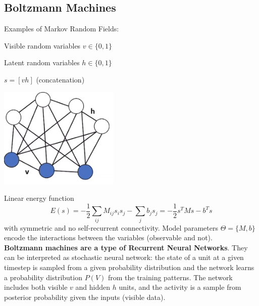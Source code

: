 \documentclass[10pt]{report}
\begin{document}
\subsection{Boltzmann Machines}
Examples of Markov Random Fields:
\begin{list}{}{}
	\item Visible random variables $v\in\{0,1\}$
	\item Latent random variables $h\in\{0,1\}$
	\item $s = [vh]$ (concatenation)
\end{list}
\begin{center}
	\includegraphics[scale=0.5]{46.png}
\end{center}
Linear energy function $$E(s) = -\frac{1}{2}\sum_{ij}M_{ij}s_is_j - \sum_jb_js_j = -\frac{1}{2}s^TMs - b^Ts$$
with symmetric and no self-recurrent connectivity. Model parameters $\Theta = \{M, b\}$ encode the interactions between the variables (observable and not).\\
\textbf{Boltzmann machines are a type of Recurrent Neural Networks}. They can be interpreted as stochastic neural network: the state of a unit at a given timestep is sampled from a given probability distribution and the network learns a probability distribution $P(V)$ from the training patterns. The network includes both visible $v$ and hidden $h$ units, and the activity is a sample from posterior probability given the inputs (visible data).
\end{document}
